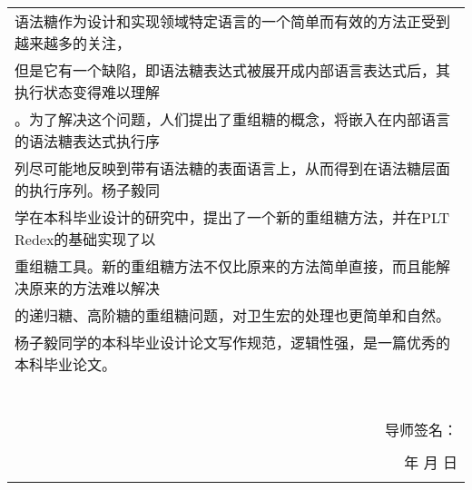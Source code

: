 \begin{table}[H]
\begin{tabular}{|rrrrrc|}
    \multicolumn{6}{|l|}{\qquad 语法糖作为设计和实现领域特定语言的一个简单而有效的方法正受到越来越多的关注，} \\
    \multicolumn{6}{|l|}{但是它有一个缺陷，即语法糖表达式被展开成内部语言表达式后，其执行状态变得难以理解} \\
    \multicolumn{6}{|l|}{。为了解决这个问题，人们提出了重组糖的概念，将嵌入在内部语言的语法糖表达式执行序} \\
    \multicolumn{6}{|l|}{列尽可能地反映到带有语法糖的表面语言上，从而得到在语法糖层面的执行序列。杨子毅同} \\
    \multicolumn{6}{|l|}{学在本科毕业设计的研究中，提出了一个新的重组糖方法，并在PLT Redex的基础实现了以} \\
    \multicolumn{6}{|l|}{重组糖工具。新的重组糖方法不仅比原来的方法简单直接，而且能解决原来的方法难以解决} \\
    \multicolumn{6}{|l|}{的递归糖、高阶糖的重组糖问题，对卫生宏的处理也更简单和自然。} \\
    \multicolumn{6}{|l|}{\qquad 杨子毅同学的本科毕业设计论文写作规范，逻辑性强，是一篇优秀的本科毕业论文。} \\
    \multicolumn{6}{|r|}{} \\
    \multicolumn{6}{|r|}{} \\
    \multicolumn{6}{|r|}{} \\
    \multicolumn{6}{|r|}{} \\
    \multicolumn{6}{|r|}{} \\
    \multicolumn{6}{|r|}{} \\
    \multicolumn{6}{|r|}{} \\
    \multicolumn{6}{|p{35.88em}|}{                                                                             \hfill 导师签名：\qquad\qquad\qquad\qquad\qquad\qquad\qquad\qquad } \\
    \multicolumn{6}{|r|}{} \\
    \multicolumn{6}{|p{35.88em}|}{\hfill 年 \qquad\quad 月 \qquad\quad 日 \qquad\qquad\qquad} \\
    \multicolumn{6}{|r|}{} \\
    \hline
    \end{tabular}
\end{table}

\renewcommand\arraystretch{1}
\restoregeometry
